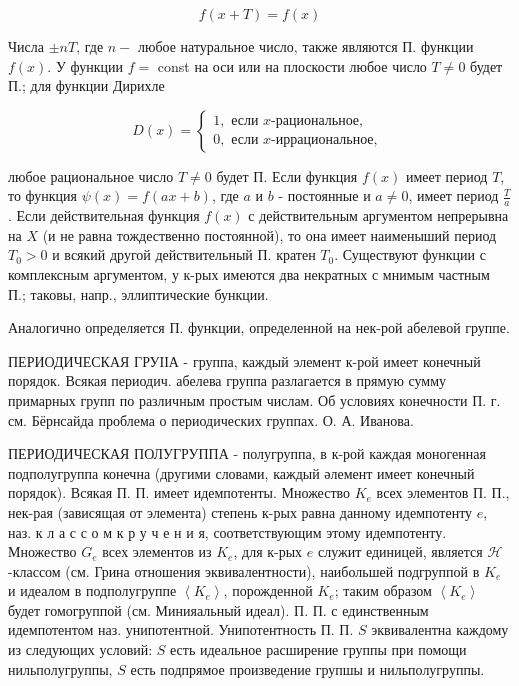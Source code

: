 \documentclass[10pt]{article}
\begin{document}
\[

f(x+T)=f(x)

\]



Числа $\pm n T$, где $n-$ любое натуральное число, также являются П. функции $f(x)$. У функции $f=$ const на оси или на плоскости любое число $T \neq 0$ будет П.; для функции Дирихле



\[

D(x)=\left\{\begin{array}{l}

1, \text { если } x \text {-рациональное, } \\

0, \text { если } x \text {-иррациональное, }

\end{array}\right.

\]



любое рациональное число $T \neq 0$ будет П. Если функция $f(x)$ имеет период $T$, то функция $\psi(x)=f(a x+b)$, где $a$ и $b$ - постоянные и $a \neq 0$, имеет период $\frac{T}{a}$. Если действительная функция $f(x)$ с действительным аргументом непрерывна на $X$ (и не равна тождественно постоянной), то она имеет наименыший период $T_{0}>0$ и всякий другой действительный П. кратен $T_{0}$. Существуют функции с комплексным аргументом, у к-рых имеются два некратных с мнимым частным П.; таковы, напр., эллиптические бункции.



Аналогично определяется П. функции, определенной на нек-рой абелевой группе.



ПЕРИОДИЧЕСКАЯ ГРУІІА - группа, каждый элемент к-рой имеет конечный порядок. Всякая периодич. абелева группа разлагается в прямую сумму примарных групп по различным простым числам. Об условиях конечности П. г. см. Бёрнсайда проблема о периодических группах. О. А. Иванова.



ПЕРИОДИЧЕСКАЯ ПОЛУГРУППА - полугруппа, в к-рой каждая моногенная подполугруппа конечна (другими словами, каждый әлемент имеет конечный порядок). Всякая П. П. имеет идемпотенты. Множество $K_{e}$ всех элементов П. П., нек-рая (зависящая от элемента) степень к-рых равна данному идемпотенту $e$, наз. к л а с с о м к р у ч е н и я, соответствующим этому идемпотенту. Множество $G_{e}$ всех элементов из $K_{e}$, для к-рых $e$ служит единицей, является $\mathscr{H}$-классом (см. Грина отношения эквивалентности), наибольшей подгруппой в $K_{e}$ и идеалом в подполугруппе $\left\langle K_{e}\right\rangle$, порожденной $K_{e}$; таким образом $\left\langle K_{e}\right\rangle$ будет гомогруппой (см. Минияальный идеал). П. П. с единственным идемпотентом наз. унипотентной. Унипотентность П. П. $S$ эквивалентна каждому из следующих условий: $S$ есть идеальное расширение группы при помощи нильполугруппы, $S$ есть подпрямое произведение групшы и нильполугруппы.
\end{document}
